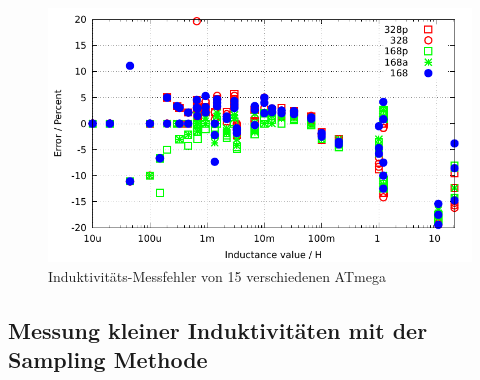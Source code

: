 \begin{figure}[H]
\centering
\includegraphics[width=18cm]{../GNU/induct328p.pdf}
\caption{Induktivitäts-Messfehler von 15 verschiedenen ATmega}
\label{fig:Induct328p}
\end{figure}

\subsection{Messung kleiner Induktivitäten mit der Sampling Methode}

